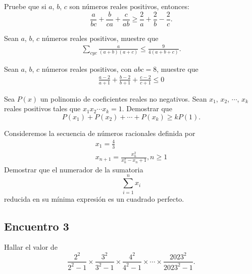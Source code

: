 \begin{section-problem}
    Pruebe que si $a$, $b$, $c$ son números reales positivos, entonces:
    \[\frac{a}{bc} + \frac{b}{ca} + \frac{c}{ab} \geq \frac{2}{a} + \frac{2}{b} - \frac{2}{c}.\]
\end{section-problem}

\begin{section-problem}
    Sean $a$, $b$, $c$ números reales positivos, muestre que
    \begin{gather*}
        \sum_{cyc} \frac{a}{(a + b)(a + c)} \leq \frac{9}{4(a + b + c)}.
    \end{gather*}
\end{section-problem}

\begin{section-problem}
    Sean $a$, $b$, $c$ números reales positivos, con $abc = 8$, muestre que
    \begin{gather*}
        \frac{a - 2}{a + 1} +
        \frac{b - 2}{b + 1} +
        \frac{c - 2}{c + 1} \leq 0
    \end{gather*}
\end{section-problem}

\begin{section-problem}
    Sea $P(x)$ un polinomio de coeficientes reales no negativos.
    Sean $x_1$, $x_2$, $\cdots$, $x_k$ reales positivos tales que $x_1 x_2 \cdots x_k = 1$.
    Demostrar que
    \[P(x_1) + P(x_2) + \cdots + P(x_k) \geq kP(1).\]
\end{section-problem}

\begin{section-problem}
    Consideremos la secuencia de números racionales definida por
    \begin{gather*}
        x_1 = \frac{4}{3} \\
        x_{n + 1} = \frac{x_n^2}{x_n^2 - x_n + 1}, n \geq 1
    \end{gather*}
    Demostrar que el numerador de la sumatoria
    \[\sum_{i = 1}^{n} x_i\]
    reducida en su mínima expresión es un cuadrado perfecto.
\end{section-problem}




\subsection{Encuentro 3}

\begin{section-problem}
    Hallar el valor de
    \[\frac{2^2}{2^2 - 1} \times \frac{3^2}{3^2 - 1} \times \frac{4^2}{4^2 - 1} \times \cdots \times \frac{2023^2}{2023^2 - 1}.\]
\end{section-problem}

